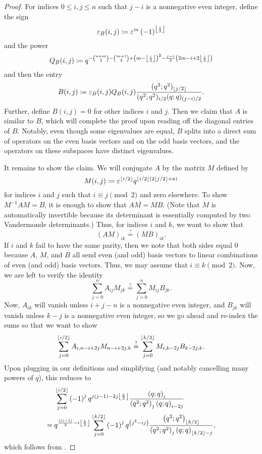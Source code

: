 \begin{proof}
    For indices $0\le i,j\le n$ such that $j-i$ is a nonnegative even integer, define the sign
    \[\varepsilon_B(i,j)\coloneqq\varepsilon^{m}\left(-1\right)^{\left\lfloor{\frac{i}{2}}\right\rfloor}\]
    and the power
    \[Q_B(i,j)\coloneqq q^{-\binom{a+m}2-\binom{m+1}2+\left(m-\left\lfloor{\frac{i}{2}}\right\rfloor\right)^{2}-\frac{j-i}{2}\left(2m-i+2\left\lfloor{\frac{i}{2}}\right\rfloor\right)}\]
    and then the entry
    \[B(i,j)\coloneqq\varepsilon_B(i,j)Q_B(i,j)\frac{(q^2;q^2)_{\left\lfloor{j/2}\right\rfloor}}{(q^2;q^2)_{i/2}(q;q)_{(j-i)/2}}.\]
    Further, define $B(i,j)=0$ for other indices $i$ and $j$. Then we claim that $A$ is similar to $B$, which will complete the proof upon reading off the diagonal entries of $B$. Notably, even though some eigenvalues are equal, $B$ splits into a direct sum of operators on the even basis vectors and on the odd basis vectors, and the operators on these subspaces have distinct eigenvalues.

    It remains to show the claim. We will conjugate $A$ by the matrix $M$ defined by
    \[M(i,j)\coloneqq\varepsilon^{\left\lfloor{i/2}\right\rfloor}q^{\left\lfloor{i/2}\right\rfloor(2\left\lfloor{j/2}\right\rfloor+a)}\]
    for indices $i$ and $j$ such that $i\equiv j\pmod2$ and zero elsewhere. To show $M^{-1}AM=B$, it is enough to show that $AM=MB$. (Note that $M$ is automatically invertible because its determinant is essentially computed by two Vandermonde determinants.) Thus, for indices $i$ and $k$, we want to show that
    \[(AM)_{ik}\stackrel?=(MB)_{ik}.\]
    If $i$ and $k$ fail to have the same parity, then we note that both sides equal $0$ because $A$, $M$, and $B$ all send even (and odd) basis vectors to linear combinations of even (and odd) basis vectors. Thus, we may assume that $i\equiv k\pmod2$. Now, we are left to verify the identity
    \[\sum_{j=0}^nA_{ij}M_{jk}\stackrel?=\sum_{j=0}^nM_{ij}B_{jk}.\]
    Now, $A_{ik}$ will vanish unless $i+j-n$ is a nonnegative even integer, and $B_{jk}$ will vanish unless $k-j$ is a nonnegative even integer, so we go ahead and re-index the sums so that we want to show
    \[\sum_{j=0}^{\left\lfloor{i/2}\right\rfloor}A_{i,n-i+2j}M_{n-i+2j,k}\stackrel?=\sum_{j=0}^{\left\lfloor{k/2}\right\rfloor}M_{i,k-2j}B_{k-2j,k}.\]
    Upon plugging in our definitions and simplifying (and notably cancelling many powers of $q$), this reduces to
    \begin{align*}
        &\sum_{j=0}^{\left\lfloor{i/2}\right\rfloor}\left(-1\right)^{j}q^{j\left(j-1\right)-2j\left\lfloor{\frac k2}\right\rfloor}\frac{\left(q;q\right)_i}{\left(q^{2};q^2\right)_j\left(q;q\right)_{i-2j}} \\
        ={}& q^{\frac{i(i-1)}2-i\left\lfloor{\frac k2}\right\rfloor}\sum_{j=0}^{\left\lfloor{k/2}\right\rfloor}\left(-1\right)^{j}q^{\left(j^{2}-ij\right)}\frac{\left(q^{2};q^2\right)_{\left\lfloor{k/2}\right\rfloor}}{\left(q^{2};q^2\right)_j\left(q;q\right)_{\left\lfloor{k/2}\right\rfloor-j}},
    \end{align*}
    which follows from .
\end{proof}
